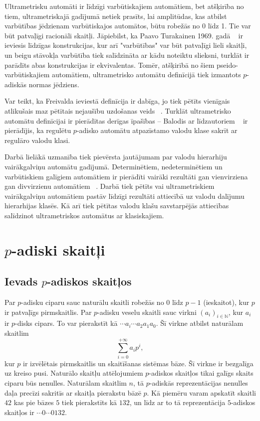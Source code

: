 \documentclass{ludis}
\begin{document}
Ultrametrisku automāti ir līdzīgi varbūtiskajiem automātiem, bet atšķirība no tiem, ultrametriskajā gadījumā netiek prasīts, lai amplitūdas, kas atbilst varbūtības jēdzienam varbūtiskajos automātos, būtu robežās no 0 līdz 1. Tie var būt patvaļīgi racionāli skaitļi. Jāpiebilst, ka Paavo Turakainen 1969. gadā ~\citep{Turakainen1969} ir ieviesis līdzīgas konstrukcijas, kur arī "varbūtības" var būt patvaļīgi lieli skaitļi, un beigu stāvokļa varbūtība tiek salīdzināta ar kādu noteiktu slieksni, turklāt ir parādīts abas konstrukcijas ir ekvivalentas. Tomēr, atšķirībā no šiem pseido-varbūtiskajiem automātiem, ultrametrisko automātu definīcijā tiek izmantots $p$-adiskās normas jēdziens.

Var teikt, ka Freivalda ieviestā definīcija ir dabīga, jo tiek pētīts vienīgais atlikušais maz pētītais nejaušību uzdošanas veids ~\citep{Freivalds2012}. Turklāt ultrametrisko automātu definīcijai ir pierādītas derīgas īpašības -- Balodis ar līdzautoriem ~\citep{KasparsBalodis2013} ir pierādījis, ka regulētu $p$-adisko automātu atpazīstamo valodu klase sakrīt ar regulāro valodu klasi.

Darbā lielākā uzmanība tiek pievērsta jautājumam par valodu hierarhiju vairākgalviņu automātu gadījumā. Determinētiem, nedeterminētiem un varbūtiskiem galīgiem automātiem ir pierādīti vairāki rezultāti gan vienvirziena gan divvirzienu automātiem ~\citep{Holzer2009,Yao1978,Monien1980,Macarie1995}. Darbā tiek pētīts vai ultrametriskiem vairākgalviņu automātiem pastāv līdzīgi rezultāti attiecībā uz valodu dalījumu hierarhijas klasēs. Kā arī tiek pētītas valodu klašu savstarpējās attiecības salīdzinot ultrametriskos automātus ar klasiskajiem.
\chapter{$p$-adiski skaitļi}
\section{Ievads $p$-adiskos skaitļos}
Par $p$-adisku ciparu sauc naturālu skaitli robežās no $0$ līdz $p-1$ (ieskaitot), kur $p$ ir patvaļīgs pirmskaitlis. Par $p$-adisku veselu skaitli sauc virkni $(a_i)_{i \in \mathbb{N}}$, kur $a_i$ ir $p$-disks cipars. To var pierakstīt kā $\cdots a_i \cdots a_2a_1a_0$.
Šī virkne atbilst naturālam skaitlim
\[\sum\limits_{i=0}^{+\infty}a_ip^i,
\]
kur $p$ ir izvēlētais pirmskaitlis un skaitīšanas sistēmas bāze. Šī virkne ir bezgalīga uz kreiso pusi. Naturālo skaitļu attēlojumiem $p$-adiskos skaitļos tikai galīgs skaits ciparu būs nenulles. Naturālam skaitlim $n$, tā $p$-adiskās reprezentācijas nenulles daļa precīzi sakritīs ar skaitļa pierakstu bāzē $p$. Kā piemēru varam apskatīt skaitli $42$ kas pie bāzes $5$ tiek pierakstīts kā $132$, un līdz ar to tā reprezentācija $5$-adiskos skaitļos ir $\cdots 0 \cdots 0132$.
\end{document}
